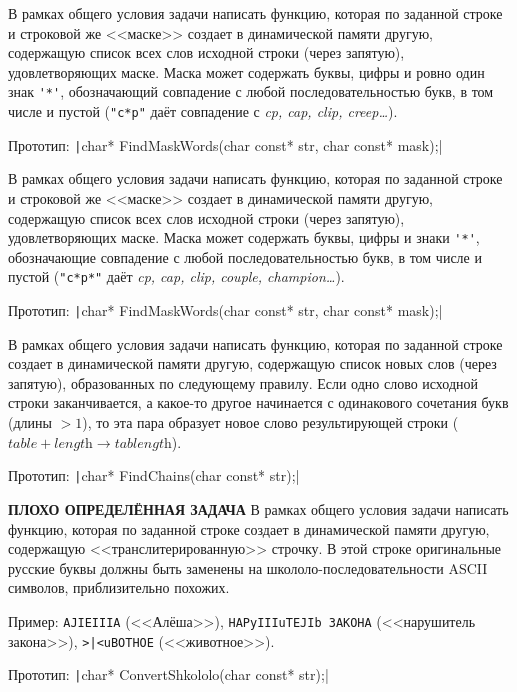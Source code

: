 \begin{zztask}
В рамках общего условия задачи написать функцию, которая по заданной строке
и строковой же <<маске>> создает в динамической памяти другую, содержащую список
всех слов исходной строки (через запятую), удовлетворяющих маске. Маска может
содержать буквы, цифры и ровно один знак \verb|'*'|, обозначающий совпадение с любой
последовательностью букв, в том числе и пустой (\verb|"c*p"| даёт совпадение с
\textit{cp, cap, clip, creep\dots}).

Прототип: \texttt|char* FindMaskWords(char const* str, char const* mask);|
\end{zztask}

\begin{zztask}
В рамках общего условия задачи написать функцию, которая по заданной строке
и строковой же <<маске>> создает в динамической памяти другую, содержащую список
всех слов исходной строки (через запятую), удовлетворяющих маске. Маска может
содержать буквы, цифры и знаки \verb|'*'|, обозначающие совпадение с любой
последовательностью букв, в том числе и пустой (\verb|"c*p*"| даёт
\textit{cp, cap, clip, couple, champion\dots}).

Прототип: \texttt|char* FindMaskWords(char const* str, char const* mask);|
\end{zztask}

\begin{zztask}
В рамках общего условия задачи написать функцию, которая по заданной строке
создает в динамической памяти другую, содержащую список новых слов (через
запятую), образованных по следующему правилу. Если одно слово исходной строки
заканчивается, а какое-то другое начинается с одинакового сочетания букв
(длины $> 1$), то эта пара образует новое слово результирующей строки
($\textit{table} + \textit{length} \rightarrow \textit{tablength}$).

Прототип: \texttt|char* FindChains(char const* str);|
\end{zztask}

\begin{zztask} \textbf{ПЛОХО ОПРЕДЕЛЁННАЯ ЗАДАЧА}
В рамках общего условия задачи написать функцию, которая по заданной строке
создает в динамической памяти другую, содержащую <<транслитерированную>>
строчку. В этой строке оригинальные русские буквы должны быть заменены на
школоло-последовательности ASCII символов, приблизительно похожих.

Пример:
\verb|AJIEIIIA| (<<Алёша>>), \verb|HAPyIIIuTEJIb 3AKOHA|
(<<нарушитель закона>>), \verb!>|<uBOTHOE! (<<животное>>).

Прототип: \texttt|char* ConvertShkololo(char const* str);|
\end{zztask}

